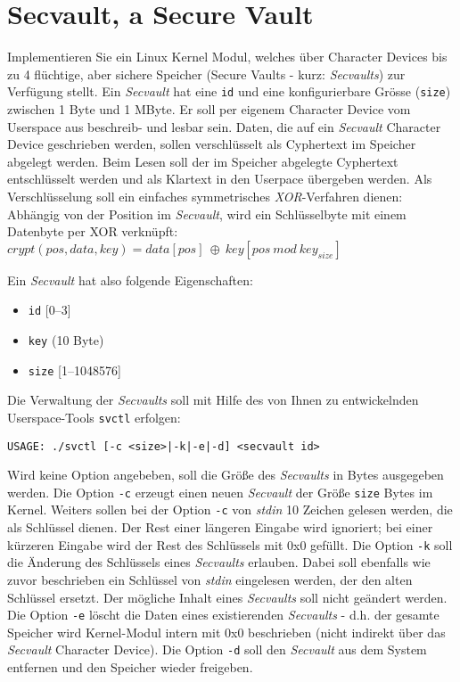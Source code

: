 \documentclass{article}
\begin{document}
\section*{Secvault, a Secure Vault}

Implementieren Sie ein Linux Kernel Modul, welches {\"u}ber Character
Devices bis zu 4 fl{\"u}chtige, aber sichere Speicher (Secure Vaults -
kurz: \emph{Secvaults}) zur Verf{\"u}gung stellt.  Ein \emph{Secvault}
hat eine \texttt{id} und eine konfigurierbare Gr{\"o}sse (\texttt{size})
zwischen 1 Byte und 1 MByte. Er soll per eigenem Character Device vom
Userspace aus beschreib- und lesbar sein. Daten, die auf ein
\emph{Secvault} Character Device geschrieben werden, sollen
verschl{\"u}sselt als Cyphertext im Speicher abgelegt werden. Beim
Lesen soll der im Speicher abgelegte Cyphertext entschl{\"u}sselt
werden und als Klartext in den Userpace {\"u}bergeben werden.  Als
Verschl{\"u}sselung soll ein einfaches symmetrisches
\emph{XOR}-Verfahren dienen: Abh{\"a}ngig von der Position im
\emph{Secvault}, wird ein Schl{\"u}sselbyte mit einem Datenbyte per
XOR verkn{\"u}pft:\\ $crypt(pos, data, key) = data[pos]\ \oplus\
key[pos\ mod\ key_{size}]$

Ein \emph{Secvault} hat also folgende Eigenschaften:
\begin{itemize}
\item \texttt{id}   [0--3]
\item \texttt{key}  (10 Byte)
\item \texttt{size} [1--1048576]
\end{itemize}

Die Verwaltung der \emph{Secvaults} soll mit Hilfe des von Ihnen zu
entwickelnden Userspace-Tools \texttt{svctl} erfolgen:
\begin{verbatim}
USAGE: ./svctl [-c <size>|-k|-e|-d] <secvault id>
\end{verbatim}

Wird keine Option angebeben, soll die Gr{\"o}{\ss}e des
\emph{Secvaults} in Bytes ausgegeben werden.
Die Option \texttt{-c} erzeugt einen neuen \emph{Secvault} der
Gr{\"o}{\ss}e \texttt{size} Bytes im Kernel. Weiters sollen bei der
Option \texttt{-c} von \emph{stdin} 10 Zeichen gelesen werden, die als
Schl{\"u}ssel dienen. Der Rest einer l{\"a}ngeren Eingabe wird
ignoriert; bei einer k{\"u}rzeren Eingabe wird der Rest des
Schl{\"u}ssels mit 0x0 gef{\"u}llt.
Die Option \texttt{-k} soll die {\"A}nderung des Schl{\"u}ssels eines
\emph{Secvaults} erlauben. Dabei soll ebenfalls wie zuvor beschrieben
ein Schl{\"u}ssel von \emph{stdin} eingelesen werden, der den alten
Schl{\"u}ssel ersetzt.
Der m{\"o}gliche Inhalt eines \emph{Secvaults} soll nicht ge{\"a}ndert werden.  
Die Option \texttt{-e} l{\"o}scht
die Daten eines existierenden \emph{Secvaults} - d.h. der gesamte
Speicher wird Kernel-Modul intern mit 0x0 beschrieben (nicht indirekt
{\"u}ber das \emph{Secvault} Character Device). Die Option \texttt{-d}
soll den \emph{Secvault} aus dem System entfernen und den Speicher
wieder freigeben.
\end{document}
